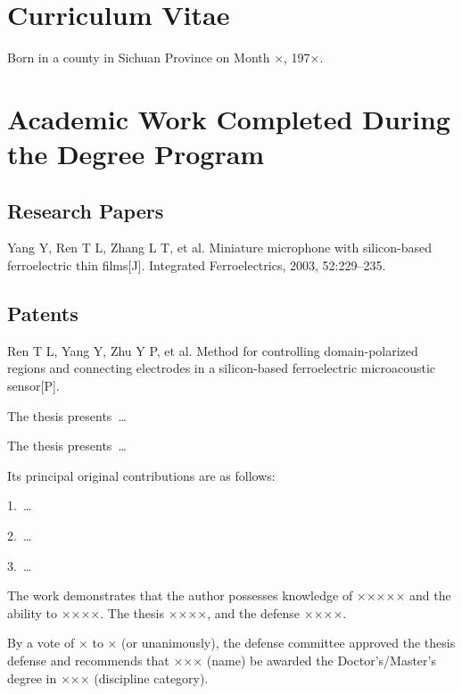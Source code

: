 \documentclass{thuthesis}
\begin{document}
\statement

\begin{resume}
  \section*{Curriculum Vitae}
  Born in a county in Sichuan Province on Month ×, 197×.
  \section*{Academic Work Completed During the Degree Program}
  \subsection*{Research Papers}
  \begin{achievements}
  \item Yang Y, Ren T L, Zhang L T, et al. Miniature microphone with
    silicon-based ferroelectric thin films[J]. Integrated
    Ferroelectrics, 2003, 52:229--235.
  \end{achievements}
  \subsection*{Patents}
  \begin{achievements}
  \item Ren T L, Yang Y, Zhu Y P, et al. Method for controlling
    domain-polarized regions and connecting electrodes in a
    silicon-based ferroelectric microacoustic sensor[P].
  \end{achievements}
\end{resume}

\begin{comments}[name={Comments from the Thesis Supervisor}]
  The thesis presents~\ldots
\end{comments}

\begin{resolution}
  The thesis presents~\ldots

  Its principal original contributions are as follows:

  1.~\ldots

  2.~\ldots

  3.~\ldots

  The work demonstrates that the author possesses knowledge of ××××× and the
  ability to ××××. The thesis ××××, and the defense ××××.

  By a vote of × to × (or unanimously), the defense committee approved the
  thesis defense and recommends that ××× (name) be awarded the Doctor's/Master's
  degree in ××× (discipline category).
\end{resolution}
\end{document}
